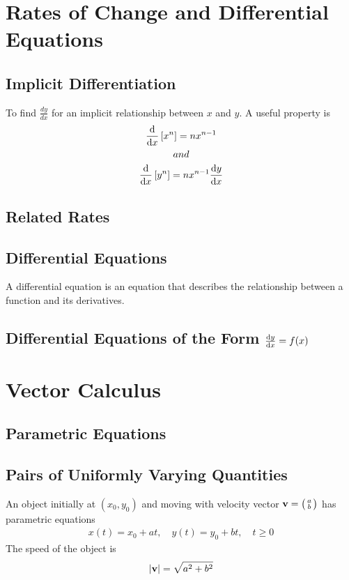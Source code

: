 \documentclass[10pt, a4paper, titlepage]{article}
\begin{document}
\begin{multicols*}{3}
	\hrulefill

	\pagebreak
	\section{Rates of Change and Differential Equations}
	\subsection{Implicit Differentiation}
	To find $\frac{dy}{dx}$ for an implicit relationship between $x$ and $y$. A useful property is
	\begin{gather}
		\begin{align}
			\dv{x}\left[x^n\right]=nx^{n-1}
		\end{align}\\
		and\\
		\begin{align}
			\dv{x}\left[y^n\right]=nx^{n-1}\dv{y}{x}
		\end{align}
	\end{gather}

	\dotfill
	\subsection{Related Rates}

	\dotfill
	\subsection{Differential Equations}
	A differential equation is an equation that describes the relationship between a function and its derivatives.

	\dotfill
	\subsection{Differential Equations of the Form $\dv{y}{x}=f(x)$}
	
	\hrulefill

	\section{Vector Calculus}
	\subsection{Parametric Equations}

	\dotfill
	\subsection{Pairs of Uniformly Varying Quantities}
	An object initially at $(x_0,y_0)$ and moving with velocity vector $\vb{v}=\big(\begin{smallmatrix}a \\b \end{smallmatrix}\big)$ has parametric equations
	\begin{align}
		x(t)=x_0+at,\quad y(t)=y_0+bt,\quad t\geq 0
	\end{align}
	The speed of the object is
	\begin{align}
		|\vb{v}|=\sqrt{a^2+b^2}
	\end{align}

\end{multicols*}
\end{document}
